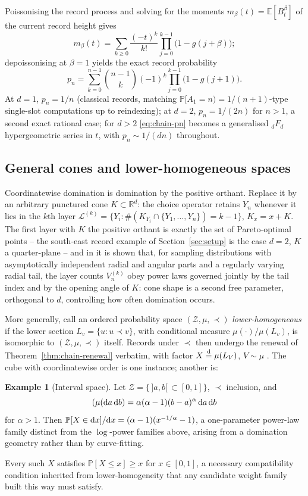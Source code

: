 \documentclass[11pt]{article}
\newcommand{\PP}{\mathbb{P}}
\newcommand{\EE}{\mathbb{E}}
\newcommand{\RR}{\mathbb{R}}
\theoremstyle{plain}
\theoremstyle{definition}
\newtheorem{example}[theorem]{Example}
\begin{document}
Poissonising the record process and solving for the moments
\(m_\beta(t)=\EE[B_t^\beta]\) of the current record height gives
$$m_\beta(t)=\sum_{k\ge0}\frac{(-t)^k}{k!}\prod_{j=0}^{k-1}\bigl(1-g(j+\beta)\bigr);$$
depoissonising at \(\beta=1\) yields the exact record probability
\begin{equation}
\label{eq:chain-pn}
p_n=\sum_{k=0}^{n-1}\binom{n-1}k(-1)^k\prod_{j=0}^{k-1}\bigl(1-g(j+1)\bigr).
\end{equation}
At \(d=1\), \(p_n=1/n\) (classical records, matching
\(\PP[A_1=n)=1/(n+1)\)-type single-slot computations up to reindexing); at
\(d=2\), \(p_n=1/(2n)\) for \(n>1\), a second exact rational case; for \(d>2\)
\eqref{eq:chain-pn} becomes a generalised \({}_dF_d\) hypergeometric series in
\(t\), with \(p_n\sim1/(dn)\) throughout.

\subsection{General cones and lower-homogeneous spaces}
\label{sec:cones}

Coordinatewise domination is domination by the positive orthant. Replace it
by an arbitrary punctured cone \(K\subset\RR^d\): the choice operator retains
\(Y_n\) whenever it lies in the \(k\)th layer
\(\mathcal L^{(k)}=\{Y_i:\#(K_{Y_i}\cap\{Y_1,\dots,Y_n\})=k-1\}\), \(K_x=x+K\).
The first layer with \(K\) the positive orthant is exactly the set of
Pareto-optimal points -- the south-east record example of
Section~\ref{sec:setup} is the case \(d=2\), \(K\) a quarter-plane -- and in
\cite{GnedinConicalExtremes1994} it is shown that, for sampling
distributions with asymptotically independent radial and angular parts and a
regularly varying radial tail, the layer counts \(V_n^{(k)}\) obey power laws
governed jointly by the tail index and by the opening angle of \(K\): cone
shape is a second free parameter, orthogonal to \(d\), controlling how often
domination occurs.

More generally, call an ordered probability space \((\mathcal Z,\mu,\prec)\)
\emph{lower-homogeneous} if the lower section \(L_v=\{u:u\prec v\}\), with
conditional measure \(\mu(\cdot)/\mu(L_v)\), is isomorphic to
\((\mathcal Z,\mu,\prec)\) itself. Records under \(\prec\) then undergo the
renewal of Theorem~\ref{thm:chain-renewal} verbatim, with factor
\(X\stackrel{\rm d}=\mu(L_V)\), \(V\sim\mu\) \cite{GnedinLastRecord2006}. The
cube with coordinatewise order is one instance; another is:

\begin{example}[Interval space]
Let \(\mathcal Z=\{\,]a,b[\,\subset[0,1]\}\), \(\prec\) inclusion, and
$$(\mu({\rm d}a\,{\rm d}b)=\alpha(\alpha-1)(b-a)^\alpha\,{\rm d}a\,{\rm d}b$$
for \(\alpha>1\). Then \(\PP[X\in{\rm d}x]/{\rm d}x=(\alpha-1)(x^{-1/\alpha}-1)\),
a one-parameter power-law family distinct from the \(\log\)-power families
above, arising from a domination geometry rather than by curve-fitting.
\end{example}
Every such \(X\) satisfies \(\PP[X\le x]\ge x\) for \(x\in[0,1]\), a necessary
compatibility condition inherited from lower-homogeneity that any candidate
weight family built this way must satisfy.
\end{document}
